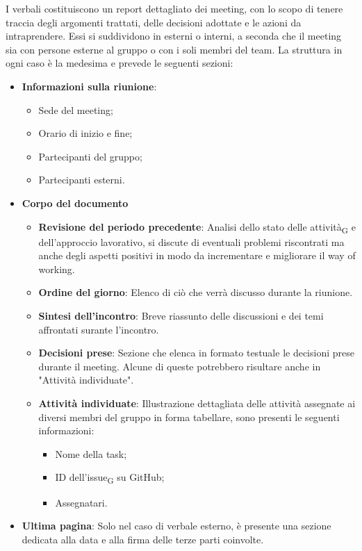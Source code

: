 I verbali costituiscono un report dettagliato dei meeting, con lo scopo di tenere traccia degli argomenti trattati, delle decisioni adottate e le
azioni da intraprendere. Essi si suddividono in esterni o interni, a seconda che il meeting sia con persone esterne al gruppo o con i soli membri del team.
La struttura in ogni caso è la medesima e prevede le seguenti sezioni:
\begin{itemize}
    \item \textbf{Informazioni sulla riunione}:
    \begin{itemize}
        \item Sede del meeting;
        \item Orario di inizio e fine;
        \item Partecipanti del gruppo;
        \item Partecipanti esterni.
    \end{itemize}
    \item \textbf{Corpo del documento}
    \begin{itemize}
        \item \textbf{Revisione del periodo precedente}:
            Analisi dello stato delle {attività\textsubscript{G}} e dell'approccio lavorativo, si discute di eventuali problemi riscontrati
            ma anche degli aspetti positivi in modo da incrementare e migliorare il way of working. 
        \item \textbf{Ordine del giorno}:
            Elenco di ciò che verrà discusso durante la riunione.
        \item \textbf{Sintesi dell'incontro}:
            Breve riassunto delle discussioni e dei temi affrontati surante l'incontro.
        \item \textbf{Decisioni prese}:
            Sezione che elenca in formato testuale le decisioni prese durante il meeting. Alcune di queste potrebbero risultare anche in "Attività individuate".        
        \item \textbf{Attività individuate}:
            Illustrazione dettagliata delle attività assegnate ai diversi membri del gruppo in forma tabellare, sono presenti le seguenti informazioni:
            \begin{itemize}
                \item Nome della task;
                \item ID dell'{issue\textsubscript{G}} su GitHub;
                \item Assegnatari.
            \end{itemize}
    \end{itemize}
    \item \textbf{Ultima pagina}:
    Solo nel caso di verbale esterno, è presente una sezione dedicata alla data e alla firma delle terze parti coinvolte.
\end{itemize}
            
